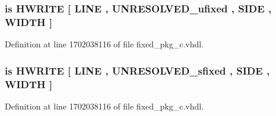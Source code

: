 \subsubsection[{H\+E\+X\+\_\+\+W\+R\+I\+T\+E}]{ {\bfseries \textcolor{keywordflow}{is}\textcolor{vhdlchar}{ }\textcolor{vhdlchar}{H\+W\+R\+I\+T\+E}\textcolor{vhdlchar}{ }\textcolor{vhdlchar}{\mbox{[}}\textcolor{vhdlchar}{ }\textcolor{vhdlchar}{L\+I\+N\+E}\textcolor{vhdlchar}{ }\textcolor{vhdlchar}{,}\textcolor{vhdlchar}{ }{\bfseries {\bf U\+N\+R\+E\+S\+O\+L\+V\+E\+D\+\_\+ufixed}} \textcolor{vhdlchar}{ }\textcolor{vhdlchar}{,}\textcolor{vhdlchar}{ }\textcolor{vhdlchar}{S\+I\+D\+E}\textcolor{vhdlchar}{ }\textcolor{vhdlchar}{,}\textcolor{vhdlchar}{ }\textcolor{vhdlchar}{W\+I\+D\+T\+H}\textcolor{vhdlchar}{ }\textcolor{vhdlchar}{\mbox{]}}\textcolor{vhdlchar}{ }} \hspace{0.3cm}{\ttfamily [Alias]}}\label{classfixed__pkg_a30e0c351405ef18dcbe9f3ac44f09b42}


Definition at line 1702038116 of file fixed\+\_\+pkg\+\_\+c.\+vhdl.

\hypertarget{classfixed__pkg_a928c95eea996f70f4b1a70ea364f86c1}{}
\subsubsection[{H\+E\+X\+\_\+\+W\+R\+I\+T\+E}]{ {\bfseries \textcolor{keywordflow}{is}\textcolor{vhdlchar}{ }\textcolor{vhdlchar}{H\+W\+R\+I\+T\+E}\textcolor{vhdlchar}{ }\textcolor{vhdlchar}{\mbox{[}}\textcolor{vhdlchar}{ }\textcolor{vhdlchar}{L\+I\+N\+E}\textcolor{vhdlchar}{ }\textcolor{vhdlchar}{,}\textcolor{vhdlchar}{ }{\bfseries {\bf U\+N\+R\+E\+S\+O\+L\+V\+E\+D\+\_\+sfixed}} \textcolor{vhdlchar}{ }\textcolor{vhdlchar}{,}\textcolor{vhdlchar}{ }\textcolor{vhdlchar}{S\+I\+D\+E}\textcolor{vhdlchar}{ }\textcolor{vhdlchar}{,}\textcolor{vhdlchar}{ }\textcolor{vhdlchar}{W\+I\+D\+T\+H}\textcolor{vhdlchar}{ }\textcolor{vhdlchar}{\mbox{]}}\textcolor{vhdlchar}{ }} \hspace{0.3cm}{\ttfamily [Alias]}}\label{classfixed__pkg_a928c95eea996f70f4b1a70ea364f86c1}


Definition at line 1702038116 of file fixed\+\_\+pkg\+\_\+c.\+vhdl.

